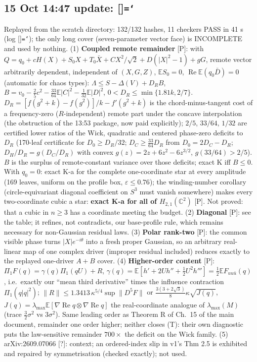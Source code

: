 \documentclass[11pt,a4paper]{article}
\newcommand{\C}{\mathbb{C}}\newcommand{\R}{\mathbb{R}}\newcommand{\E}{\mathbb{E}}\newcommand{\Hc}[2]{H_{#1,#2}}
\renewcommand{\Re}{\operatorname{Re}}\newcommand{\Var}{\operatorname{Var}}\newcommand{\ph}{\operatorname{phase}}\newcommand{\st}[1]{\textsf{[#1]}}\newcommand{\brkus}{\textunderscore\allowbreak}\usepackage{xstring,adjustbox}\DeclareRobustCommand{\code}[1]{\begingroup\noexpandarg\StrSubstitute{#1}{/}{/\allowbreak}[\brktmp]\texttt{\let\_\brkus\hyphenchar\font=`\-\brktmp}\endgroup}\setlength{\emergencystretch}{3em}
\begin{document}
\subsection*{15 Oct 14:47 update: \code{k-next-20261015}}\label{sec:knext}
Replayed from the scratch directory: 132/132 hashes, 11 checkers PASS in 41 s (log \code{kattack-2026-10-15/gpt\_knext\_replay.log}); the only long cover (seven-parameter vector face) is
INCOMPLETE and used by nothing. (1) \textbf{Coupled remote remainder} \st{P}: with $Q=q_0+cH(X)+S_0X+T_0\bar X+CX^2/\sqrt2+D(|X|^2-1)+gG$, remote vector arbitrarily dependent, independent of
$(X,G,Z)$, $\E S_0=0$, $\Re\E(q_0\bar D)=0$ (automatic for chaos types): $\Lambda\le S-\Delta(V)+D_RB$, $B=v_0-\frac25c^2-\frac{33}{64}\E|C|^2-\frac1{32}\E|D|^2$, $0<D_R\le\min\{1.81k,2/7\}$.
$D_R=[f(g^2+k)-f(g^2)]/k-f'(g^2+k)$ is the chord-minus-tangent cost of a frequency-zero ($R$-independent) remote part under the concave interpolation (the obstruction of the 13:53 package, now paid
explicitly); $2/5$, $33/64$, $1/32$ are certified lower ratios of the Wick, quadratic and centered phase-zero deficits to $D_R$ (170-leaf certificate for $D_0\ge D_R/32$; $D_C\ge\frac{33}{64}D_R$ from
$D_0=2D_C-D_R$; $D_H/D_R=g(D_C/D_R)$ with convex $g(z)=2z+6z^2-6z^{3/2}$, $g(33/64)>2/5$). $B$ is the surplus of remote-constant variance over those deficits; exact K iff $B\le0$. With $q_0=0$: exact
K-a for the complete one-coordinate star at every amplitude (169 leaves, uniform on the profile box, $\varepsilon\le0.76$); the winding-number corollary (circle-equivariant diagonal coefficient
on $S^3$ must vanish somewhere) makes every two-coordinate cubic a star: \textbf{exact K-a for all of $\Hc21(\C^2)$} \st{P}. Not proved: that a cubic in $n\ge3$ has a coordinate meeting the budget.
(2) \textbf{Diagonal} \st{P}: see the table; it refines, not contradicts, our base-profile rule, which remains necessary for non-Gaussian residual laws. (3) \textbf{Polar rank-two} \st{P}: the
common visible phase turns $|X|e^{-i\theta}$ into a fresh proper Gaussian, so an arbitrary real-linear map of one complex driver (improper residual included) reduces exactly to the
replayed one-driver $A{+}B$ cover. (4) \textbf{Higher-order content} \st{P}: $\Pi_1F(q)=\gamma(q)\Pi_1(qU)+R$, $\gamma(q)=\E[h'+2Uh''+\frac12U^2h''']=\frac12\E F_{uu\bar u}(q)$, i.e.\ exactly our
``mean third derivative'' times the influence contraction $\Pi_1(q|q|^2)$; $\|R\|\le1.3413\,\kappa^{5/4}\sup\|D^5F\|$ or $\frac{3(3+2\sqrt3)}8\kappa\sqrt{J(q)}$, $J(q)=\lambda_{\max}\E[\nabla\Re q\otimes\nabla\Re q]$
the real-coordinate analogue of $\lambda_{\max}(M)$ (trace $\frac32\sigma^2$ vs $3\sigma^2$). Same leading order as Theorem R of Ch.~15 of the main document, remainder one order higher; neither
closes (T): their own diagnostic puts the law-sensitive remainder $700\times$ the deficit on the Wick family. (5) arXiv:2609.07066 \st{?}: context; an ordered-index slip in v1's Thm 2.5 is
exhibited and repaired by symmetrisation (checked exactly); not used.
\end{document}
